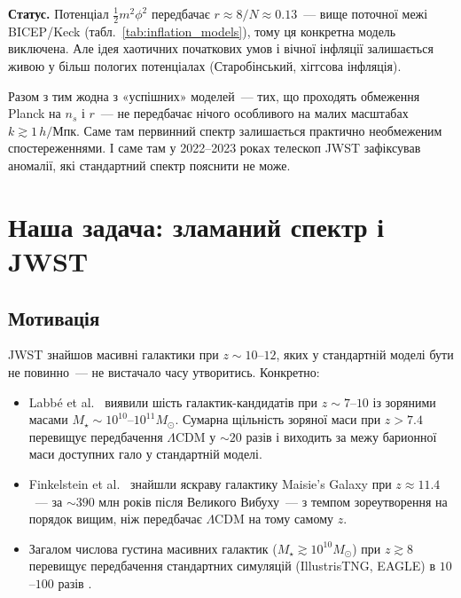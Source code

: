 \documentclass[12pt, a4paper]{article}
\begin{document}
\textbf{Статус.} Потенціал $\tfrac{1}{2}m^2\phi^2$ передбачає
$r \approx 8/N \approx 0.13$~--- вище поточної межі BICEP/Keck
(табл.~\ref{tab:inflation_models}), тому ця конкретна модель
виключена. Але ідея хаотичних початкових умов і вічної інфляції
залишається живою у більш пологих потенціалах (Старобінський,
хіггсова інфляція).

Разом з тим жодна з «успішних» моделей~--- тих, що проходять
обмеження Planck на $n_s$ і $r$~--- не передбачає нічого
особливого на малих масштабах $k \gtrsim 1\,h/$Мпк. Саме там
первинний спектр залишається практично необмеженим
спостереженнями. І саме там у 2022--2023 роках телескоп JWST
зафіксував аномалії, які стандартний спектр пояснити не може.


\section{Наша задача: зламаний спектр і JWST}
\label{sec:broken}

\subsection{Мотивація}

JWST знайшов масивні галактики при $z \sim 10$--$12$, яких у стандартній
моделі бути не повинно~--- не вистачало часу утворитись. Конкретно:

\begin{itemize}
  \item Labb\'e et al.\ \cite{labbe_2023} виявили шість галактик-кандидатів
        при $z \sim 7$--$10$ із зоряними масами $M_\star \sim 10^{10}$--$10^{11}
        M_\odot$. Сумарна щільність зоряної маси при $z > 7.4$
        перевищує передбачення $\Lambda$CDM у $\sim\!20$ разів і
        виходить за межу барионної маси доступних гало у стандартній моделі.
  \item Finkelstein et al.\ \cite{finkelstein_2023} знайшли яскраву галактику
        Maisie's Galaxy при $z \approx 11.4$~--- за ${\sim}390$ млн років
        після Великого Вибуху~--- з темпом зореутворення на порядок вищим,
        ніж передбачає $\Lambda$CDM на тому самому $z$.
  \item Загалом числова густина масивних галактик ($M_\star \gtrsim 10^{10}
        M_\odot$) при $z \gtrsim 8$ перевищує передбачення стандартних
        симуляцій (IllustrisTNG, EAGLE) в $10$--$100$ разів \cite{boylan_kolchin_2023}.
\end{itemize}
\end{document}
